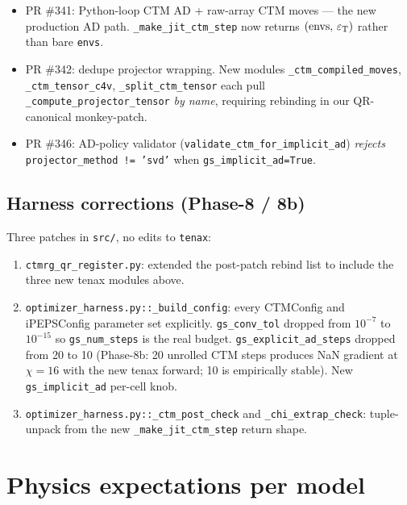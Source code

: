 \documentclass[aps,prresearch,reprint,amsmath,amssymb,floatfix]{revtex4-2}
\newcommand{\tenax}{\texttt{tenax}}
\newcommand{\code}[1]{\texttt{#1}}
\begin{document}
\begin{itemize}
  \item PR \#341: Python-loop CTM AD + raw-array CTM moves --- the new
        production AD path. \code{\_make\_jit\_ctm\_step} now returns
        $(\rm envs,\,\varepsilon_T)$ rather than bare \code{envs}.
  \item PR \#342: dedupe projector wrapping. New modules
        \code{\_ctm\_compiled\_moves}, \code{\_ctm\_tensor\_c4v},
        \code{\_split\_ctm\_tensor} each pull
        \code{\_compute\_projector\_tensor} \emph{by name}, requiring
        rebinding in our QR-canonical monkey-patch.
  \item PR \#346: AD-policy validator
        (\code{validate\_ctm\_for\_implicit\_ad}) \emph{rejects}
        \code{projector\_method != 'svd'} when
        \code{gs\_implicit\_ad=True}.
\end{itemize}

\subsection{Harness corrections (Phase-8 / 8b)}

Three patches in \code{src/}, no edits to \tenax{}:

\begin{enumerate}
  \item \code{ctmrg\_qr\_register.py}: extended the post-patch rebind list
        to include the three new tenax modules above.
  \item \code{optimizer\_harness.py::\_build\_config}: every CTMConfig and
        iPEPSConfig parameter set explicitly. \code{gs\_conv\_tol} dropped
        from $10^{-7}$ to $10^{-15}$ so \code{gs\_num\_steps} is the real
        budget. \code{gs\_explicit\_ad\_steps} dropped from 20 to 10
        (Phase-8b: 20 unrolled CTM steps produces NaN gradient at $\chi=16$
        with the new tenax forward; 10 is empirically stable). New
        \code{gs\_implicit\_ad} per-cell knob.
  \item \code{optimizer\_harness.py::\_ctm\_post\_check} and
        \code{\_chi\_extrap\_check}: tuple-unpack from the new
        \code{\_make\_jit\_ctm\_step} return shape.
\end{enumerate}

\section{Physics expectations per model}
\end{document}
